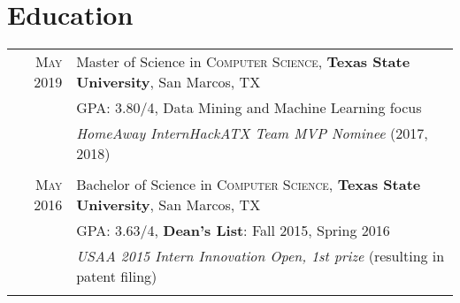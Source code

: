 \documentclass[a4paper,10pt]{article}
\begin{document}
\section{Education}
\begin{tabular}{rl}	
	\textsc{May} 2019 & Master of Science in \textsc{Computer Science}, \textbf{Texas State University}, San Marcos, TX\\
	
	&\normalsize \textsc{GPA}: 3.80/4, Data Mining and Machine Learning focus \\ 
	
	& \emph{HomeAway InternHackATX Team MVP Nominee} (2017, 2018) \\
	
	& \\
	
	\textsc{May} 2016 & Bachelor of Science in \textsc{Computer Science}, \textbf{Texas State University}, San Marcos, TX \\
	
	&\normalsize \textsc{GPA}: 3.63/4,  \textbf{Dean’s List}: Fall 2015, Spring 2016 \\
	
	& \emph{USAA 2015 Intern Innovation Open, 1st prize} (resulting in patent filing)  \\
	
	& \\
\end{tabular}

\end{document}
